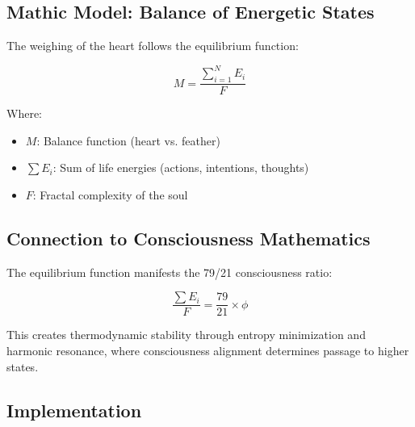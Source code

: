 \documentclass[12pt]{article}
\begin{document}
\subsection{Mathic Model: Balance of Energetic States}

The weighing of the heart follows the equilibrium function:

\[M = \frac{\sum_{i=1}^{N} E_i}{F}\]

Where:
\begin{itemize}
    \item \(M\): Balance function (heart vs. feather)
    \item \(\sum E_i\): Sum of life energies (actions, intentions, thoughts)
    \item \(F\): Fractal complexity of the soul
\end{itemize}

\subsection{Connection to Consciousness Mathematics}

The equilibrium function manifests the 79/21 consciousness ratio:

\[\frac{\sum E_i}{F} = \frac{79}{21} \times \phi\]

This creates thermodynamic stability through entropy minimization and harmonic resonance, where consciousness alignment determines passage to higher states.

\subsection{Implementation}
\end{document}
